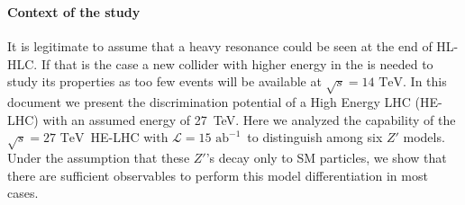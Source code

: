 \subsubsection{}

\newcommand*{\sqrtslhc}{\ensuremath{\sqrt{s}=\text{14 TeV}}}
\newcommand*{\sqrtshelhc}{\ensuremath{\sqrt{s}=\text{27 TeV}}}
\renewcommand*{\intlumihelhc}{\ensuremath{\mathcal{L}=15\text{ ab}^{-1}}}
\newcommand*{\intlumihllhc}{\ensuremath{\mathcal{L}=3\text{ ab}^{-1}}}


\paragraph*{Context of the study}
It is legitimate to assume that a heavy resonance could be seen at the end of HL-HLC. If that is the case a new collider with higher energy
in the \com is needed to study its properties as too few events will be available at \sqrtslhc. In this document we present the discrimination potential of a High Energy LHC (HE-LHC) with an assumed \com energy of 27~TeV. Here we analyzed the capability of the \sqrtshelhc\ HE-LHC with \intlumihelhc\ to distinguish among six $Z'$ models. Under the assumption that these $Z'$'s decay only to SM particles, we show that there are sufficient observables to perform this model differentiation in most cases.

